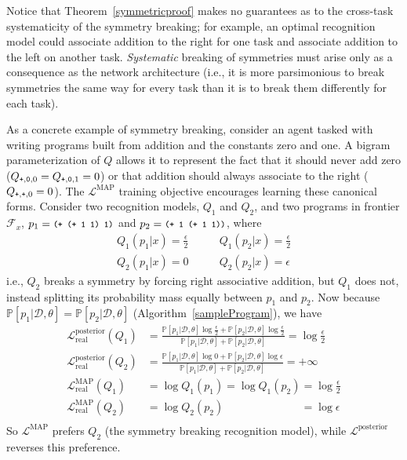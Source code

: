\documentclass{article}
\newcommand{\code}[1]{{\footnotesize\texttt{#1}}}
\newcommand{\probability}{\mathds{P}} %
\begin{document}
 Notice that Theorem~\ref{symmetricproof} makes no guarantees as to the
 cross-task systematicity of the symmetry breaking; for example, an
 optimal recognition model could associate addition to the right for
 one task and associate addition to the left on another task. \emph{Systematic} breaking of symmetries
 must arise only as a consequence as
 the network architecture (i.e., it is more parsimonious to break symmetries the same way for every task than it is to break them differently for each task).
 
As a concrete example of symmetry breaking, consider an agent tasked with writing programs built from addition and the constants zero and one.
A bigram parameterization of $Q$ allows
it to represent the fact that it should never add zero ($Q_{\code{+},\code{0},0} = Q_{\code{+},\code{0},1} = 0$)
or that addition should always associate to the right
($Q_{\code{+},\code{+},0} = 0$).
The $\mathcal{L}^{\text{MAP}}$ training objective encourages
learning these canonical forms.
Consider two recognition models, $Q_1$ and $Q_2$,
and two programs in frontier $\mathcal{F}_x$,
$p_1=\code{(+ (+ 1 1) 1)}$ and $p_2=\code{(+ 1 (+ 1 1))}$,
where
\begin{align*}
  Q_1(p_1|x) = \frac{\epsilon}{2}&\qquad Q_1(p_2|x) = \frac{\epsilon}{2}\\
  Q_2(p_1|x) = 0&\qquad  Q_2(p_2|x) = \epsilon
\end{align*}
i.e., $Q_2$ breaks a symmetry by forcing right associative addition,
but $Q_1$ does not, instead splitting its probability mass equally between $p_1$ and $p_2$.
Now because $\probability[p_1|\mathcal{D},\theta] = \probability[p_2|\mathcal{D},\theta]$
(Algorithm~\ref{sampleProgram}),
we have
\begin{align*}
  \mathcal{L}^{\text{posterior}}_{\text{real}}(Q_1)& = \frac{\probability[p_1|\mathcal{D},\theta]\log \frac{\epsilon}{2} + \probability[p_2|\mathcal{D},\theta]\log \frac{\epsilon}{2}}{\probability[p_1|\mathcal{D},\theta] + \probability[p_2|\mathcal{D},\theta]} = \log \frac{\epsilon}{2}\\
  \mathcal{L}^{\text{posterior}}_{\text{real}}(Q_2)& = \frac{\probability[p_1|\mathcal{D},\theta]\log 0 + \probability[p_2|\mathcal{D},\theta]\log \epsilon}{\probability[p_1|\mathcal{D},\theta] + \probability[p_2|\mathcal{D},\theta]} = +\infty\\
  \mathcal{L}^{\text{MAP}}_{\text{real}}(Q_1)& = \log Q_1(p_1)           = \log Q_1(p_2)   = \log \frac{\epsilon}{2}\\
  \mathcal{L}^{\text{MAP}}_{\text{real}}(Q_2)& = \log Q_2(p_2) \phantom{ = \log Q_1(p_2) } = \log \epsilon\\
\end{align*}
So $\mathcal{L}^{\text{MAP}}$ prefers $Q_2$ (the symmetry breaking
recognition model), while $\mathcal{L}^{\text{posterior}}$ reverses
this preference.
\end{document}
